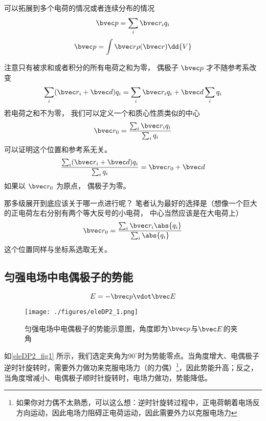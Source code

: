 

可以拓展到多个电荷的情况或者连续分布的情况
\begin{equation}
\bvec p = \sum_i \bvec r_i q_i
\end{equation}
\begin{equation}
\bvec p = \int \bvec r \rho(\bvec r) \dd{V}
\end{equation}

注意只有被求和或者积分的所有电荷之和为零， 偶极子 $\bvec p$ 才不随参考系改变
\begin{equation}
\sum_i (\bvec r_i + \bvec d) q_i = \sum_i \bvec r_i q_i + \bvec d \sum_i q_i
\end{equation}
若电荷之和不为零， 我们可以定义一个和质心性质类似的中心
\begin{equation}
\bvec r_0 = \frac{\sum_i \bvec r_i q_i}{\sum_i q_i}
\end{equation}
可以证明这个位置和参考系无关。
\begin{equation}
\frac{\sum_i (\bvec r_i + \bvec d) q_i}{\sum_i q_i} = \bvec r_0 + \bvec d
\end{equation}
如果以 $\bvec r_0$ 为原点， 偶极子为零。

那多级展开到底应该关于哪一点进行呢？ 笔者认为最好的选择是（想像一个巨大的正电荷左右分别有两个等大反号的小电荷， 中心当然应该是在大电荷上）
\begin{equation}
\bvec r_0 = \frac{\sum_i \bvec r_i \abs{q_i}}{\sum_i \abs{q_i}}
\end{equation}
这个位置同样与坐标系选取无关。

\subsection{匀强电场中电偶极子的势能}
\begin{equation}\label{eleDP2_eq1}
E = -\bvec p \vdot \bvec E
\end{equation}
\begin{figure}[ht]
\centering
\texttt{[image: ./figures/eleDP2\_1.png]}
\caption{匀强电场中电偶极子的势能示意图，角度即为$\bvec p$与$\bvec E$的夹角} \label{eleDP2_fig1}
\end{figure}
如\autoref{eleDP2_fig1} 所示，我们选定夹角为$90^\circ$时为势能零点。当角度增大、电偶极子逆时针旋转时，需要外力做功来克服电场力（的力偶）\footnote{如果你对力偶不太熟悉，可以这么想：逆时针旋转过程中，正电荷朝着电场反方向运动，因此电场力阻碍正电荷运动，因此需要外力以克服电场力}，因此势能升高；反之，当角度增减小、电偶极子顺时针旋转时，电场力做功，势能降低。
